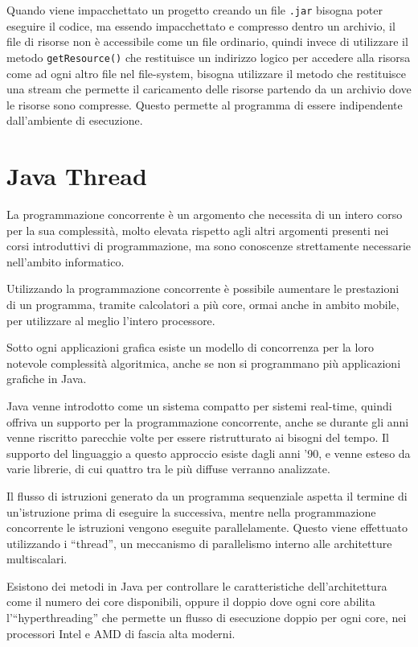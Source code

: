\documentclass{article}
\numberwithin{equation}{subsection}
\begin{document}
Quando viene impacchettato un progetto creando un file \verb|.jar| bisogna poter eseguire il codice, ma essendo impacchettato e compresso dentro un archivio, il file di 
risorse non è accessibile come un file ordinario, quindi invece di utilizzare il metodo \verb|getResource()| che restituisce un indirizzo logico per accedere alla risorsa come 
ad ogni altro file nel file-system, bisogna utilizzare il metodo che restituisce una stream che permette il caricamento delle risorse partendo da un archivio dove le risorse sono 
compresse. 
Questo permette al programma di essere indipendente dall'ambiente di esecuzione. 

\clearpage

\section{Java Thread}

La programmazione concorrente è un argomento che necessita di un intero corso per la sua complessità, molto elevata rispetto agli altri argomenti presenti nei corsi 
introduttivi di programmazione, ma sono conoscenze strettamente necessarie nell'ambito informatico. 

Utilizzando la programmazione concorrente è possibile aumentare le prestazioni di un programma, tramite calcolatori a più core, ormai anche in ambito mobile, per utilizzare al 
meglio l'intero processore. 

Sotto ogni applicazioni grafica esiste un modello di concorrenza per la loro notevole complessità algoritmica, anche se non si programmano più applicazioni 
grafiche in Java. 

Java venne introdotto come un sistema compatto per sistemi real-time, quindi offriva un supporto per la programmazione concorrente, anche se durante gli anni venne 
riscritto parecchie volte per essere ristrutturato ai bisogni del tempo. 
Il supporto del linguaggio a questo approccio esiste dagli anni '90, e venne esteso da varie librerie, di cui quattro tra le più diffuse verranno analizzate. 

Il flusso di istruzioni generato da un programma sequenziale aspetta il termine di un'istruzione prima di eseguire la successiva, mentre nella programmazione 
concorrente le istruzioni vengono eseguite parallelamente.  
Questo viene effettuato utilizzando i ``thread'', un meccanismo di parallelismo interno alle architetture multiscalari. 

Esistono dei metodi in Java per controllare le caratteristiche dell'architettura come il numero dei core disponibili, oppure il doppio dove ogni core abilita l'``hyperthreading'' 
che permette un flusso di esecuzione doppio per ogni core, nei processori Intel e AMD di fascia alta moderni. 
\end{document}
